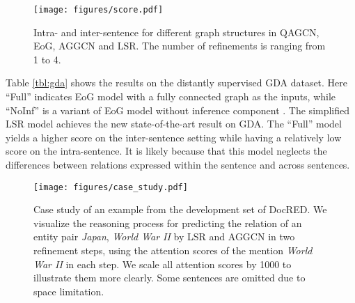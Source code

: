 \documentclass[11pt,a4paper]{article}
\begin{document}
\begin{table}[]
\centering
\small
{}
\vspace{-2mm}
\caption{\label{tbl:gda} Results on the test set of the GDA dataset.}
\vspace{-1mm}
\end{table} 
\begin{figure}
    \centering
    \texttt{[image: figures/score.pdf]}
    \vspace{-1mm}
    \caption{Intra- and inter-sentence  for different graph structures in QAGCN, EoG, AGGCN and LSR. The number of refinements is ranging from 1 to 4.}
    \label{fig:score}
    \vspace{-6mm}
\end{figure}

 Table \ref{tbl:gda} shows the results on the distantly supervised GDA dataset. Here ``Full'' indicates EoG model with a fully connected graph as the inputs, while ``NoInf'' is a variant of EoG model without inference component \cite{christopoulou2018walk}. The simplified LSR model achieves the new state-of-the-art result on GDA. The ``Full'' model \cite{christopoulou2019connecting} yields a higher  score on the inter-sentence setting while having a relatively low score on the intra-sentence. It is likely because that this model neglects the differences between relations expressed within the sentence and across sentences. 






\begin{figure*}
    \centering
    \texttt{[image: figures/case\_study.pdf]}
    \vspace{-1mm}
    \caption{Case study of an example from the development set of DocRED. We visualize the reasoning process for predicting the relation of an entity pair \textit{Japan}, \textit{World War II} by LSR and AGGCN in two refinement steps, using the attention scores of the mention \textit{World War II} in each step. We scale all attention scores by 1000 to illustrate them more clearly. Some sentences are omitted due to space limitation.}
    \label{fig:case}
    \vspace{-4mm}
\end{figure*}
\end{document}
